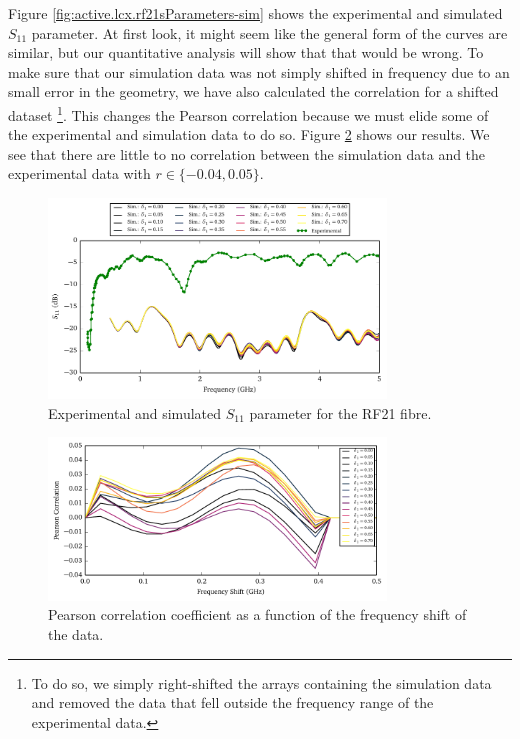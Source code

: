 Figure \ref{fig:active.lcx.rf21sParameters-sim} shows the experimental and simulated
$S_{11}$ parameter. At first look, it might seem like the general form 
of the curves are similar, but our quantitative analysis will show 
that that would be wrong. To make sure that our simulation data was not simply
shifted in frequency due to an small error in the geometry, we have
also calculated the correlation for a shifted dataset 
\footnote{To do so, we simply right-shifted the arrays containing
the simulation data and removed the data that fell outside the frequency range 
of the experimental data.}. This changes
the Pearson correlation because we must elide some of the experimental
and simulation data to do so. Figure \ref{fig:antenna.shiftCorrelation}
shows our results. We see that there are little to no correlation
between the simulation data and the experimental data with $r\in\{-0.04,0.05\}$. 

\begin{figure}
 \centering
 \includegraphics[width=0.8\textwidth]{figs/active/sParameters-concSweepS11.pdf}
 \caption[Experimental and simulated $S_{11}$ parameter for the RF21 fibre]
	 {Experimental and simulated $S_{11}$ parameter for the RF21 fibre.}
 \label{fig:active.lcx.rf21sParameters-concSweep}
\end{figure}

\begin{figure}
 \centering
 \includegraphics[width=0.8\textwidth]{figs/active/shiftCorrelationS11.pdf}
 \caption{Pearson correlation coefficient as a function of the frequency
	  shift of the data.}
 \label{fig:antenna.shiftCorrelation}
\end{figure}

